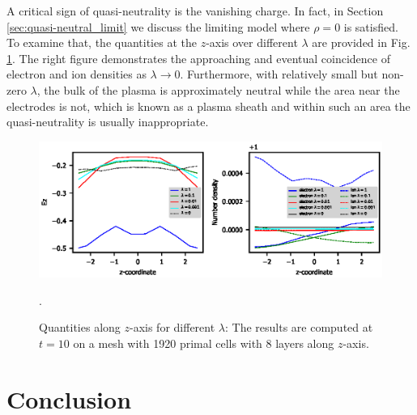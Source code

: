 \documentclass{article}
\begin{document}
A critical sign of quasi-neutrality is the vanishing charge. In fact, in Section \ref{sec:quasi-neutral_limit} we discuss the limiting model where $\rho = 0$ is satisfied. To examine that, the quantities at the $z$-axis over different $\lambda$ are provided in Fig. \ref{fig:zaxis-data_vs_z-T_10}. The right figure demonstrates the approaching and eventual coincidence of electron and ion densities as $\lambda \rightarrow 0$. Furthermore, with relatively small but non-zero $\lambda$, the bulk of the plasma is approximately neutral while the area near the electrodes is not, which is known as a plasma sheath and within such an area the quasi-neutrality is usually inappropriate.
\begin{figure}
    \centering
    \includegraphics{zaxis-data_vs_z-T_10.eps}
    \caption{Quantities along $z$-axis for different $\lambda$: The results are computed at $t = 10$ on a mesh with 1920 primal cells with 8 layers along $z$-axis.}.
    \label{fig:zaxis-data_vs_z-T_10}
\end{figure}

\section{Conclusion}


\end{document}
